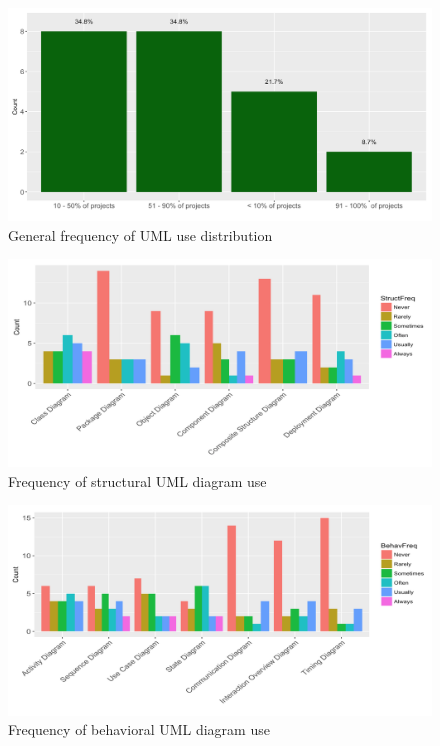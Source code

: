 \documentclass[letterpaper, 10 pt, conference]{ieeeconf}  %
\begin{document}
	\begin{figure}[!htb]
      \centering
      \includegraphics[scale=0.25]{Plots/GenUmlUsePlot}
      \caption{General frequency of UML use distribution}
      \label{GenUML}
   \end{figure}
   
   \begin{figure}[!htb]
      \centering
      \includegraphics[scale=0.3]{Plots/StructUMLPlot}
      \caption{Frequency of structural UML diagram use}
      \label{StructUML}
   \end{figure}
   
   \begin{figure}[!htb]
      \centering
      \includegraphics[scale=0.3]{Plots/BehavUMLPlot}
      \caption{Frequency of behavioral UML diagram use}
      \label{BehavUML}
   \end{figure}
\end{document}
